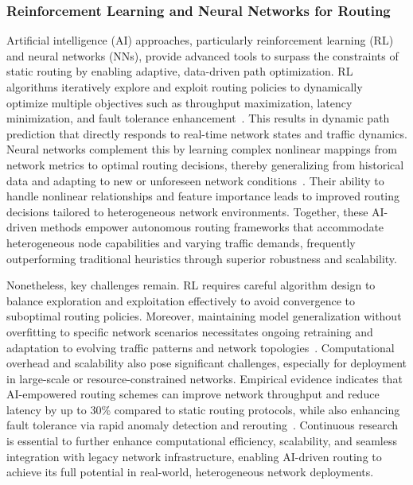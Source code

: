 \documentclass[sigconf]{acmart}
\begin{document}
\subsubsection{Reinforcement Learning and Neural Networks for Routing}

Artificial intelligence (AI) approaches, particularly reinforcement learning (RL) and neural networks (NNs), provide advanced tools to surpass the constraints of static routing by enabling adaptive, data-driven path optimization. RL algorithms iteratively explore and exploit routing policies to dynamically optimize multiple objectives such as throughput maximization, latency minimization, and fault tolerance enhancement~\cite{ref4,ref53}. This results in dynamic path prediction that directly responds to real-time network states and traffic dynamics. Neural networks complement this by learning complex nonlinear mappings from network metrics to optimal routing decisions, thereby generalizing from historical data and adapting to new or unforeseen network conditions~\cite{ref17}\textemdash\cite{ref20}. Their ability to handle nonlinear relationships and feature importance leads to improved routing decisions tailored to heterogeneous network environments. Together, these AI-driven methods empower autonomous routing frameworks that accommodate heterogeneous node capabilities and varying traffic demands, frequently outperforming traditional heuristics through superior robustness and scalability.

Nonetheless, key challenges remain. RL requires careful algorithm design to balance exploration and exploitation effectively to avoid convergence to suboptimal routing policies. Moreover, maintaining model generalization without overfitting to specific network scenarios necessitates ongoing retraining and adaptation to evolving traffic patterns and network topologies~\cite{ref53}. Computational overhead and scalability also pose significant challenges, especially for deployment in large-scale or resource-constrained networks. Empirical evidence indicates that AI-empowered routing schemes can improve network throughput and reduce latency by up to 30\% compared to static routing protocols, while also enhancing fault tolerance via rapid anomaly detection and rerouting~\cite{ref4,ref53}. Continuous research is essential to further enhance computational efficiency, scalability, and seamless integration with legacy network infrastructure, enabling AI-driven routing to achieve its full potential in real-world, heterogeneous network deployments.
\end{document}
